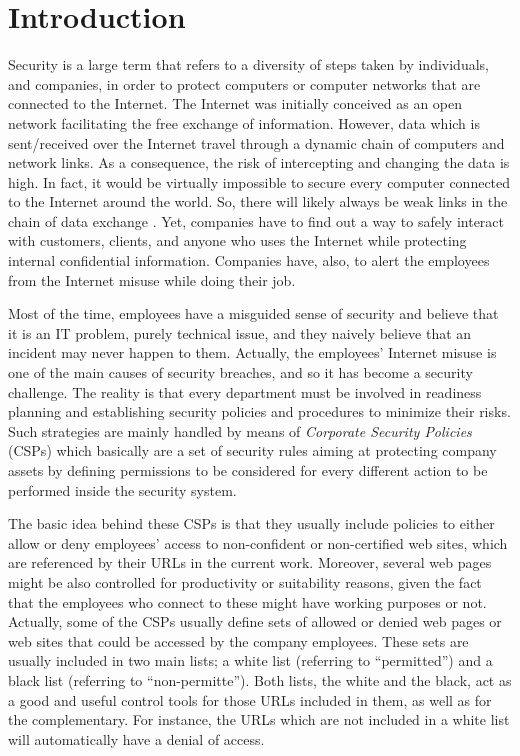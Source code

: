 \documentclass{llncs}
\begin{document}

%
%
\section{Introduction}
\label{sec:introduction}

\noindent Security is a large term that refers to a diversity of steps taken by individuals, and companies, in order to protect computers or computer networks that are connected to the Internet. The Internet was initially conceived as an open network facilitating the free exchange of information. However, data which is sent/received over the Internet travel through a dynamic chain of computers and network links. As a consequence, the risk of intercepting and changing the data is high. In fact, it would be virtually impossible to secure every computer connected to the Internet around the world. So, there will likely always be weak links in the chain of data exchange \cite{cheswick2003firewalls}. Yet, companies have to find out a way to safely interact with customers, clients, and anyone who uses the Internet while protecting internal confidential information. Companies have, also, to alert the employees from the Internet misuse while doing their job.
 
Most of the time, employees have a misguided sense of security and believe that it is an IT problem, purely technical issue, and they naively believe that an incident may never happen to them. Actually, the employees' Internet misuse is one of the main causes of security breaches, and so it has become a security challenge. The reality is that every department must be involved in readiness planning and establishing security policies and procedures to minimize their risks. Such strategies are mainly handled by means of \textit{Corporate Security Policies} (CSPs) which basically are a set of security rules aiming at protecting company assets by defining permissions to be considered for every different action to be performed inside the security system.
 
The basic idea behind these CSPs is that they usually include policies to either allow or deny employees' access to non-confident or non-certified web sites, which are referenced by their URLs in the current work. Moreover, several web pages might be also controlled for productivity or suitability reasons, given the fact that the employees who connect to these might have working purposes or not. Actually, some of the CSPs usually define sets of allowed or denied web pages or web sites that could be accessed by the company employees. These sets are usually included in two main lists; a white list (referring to ``permitted'') and a black list (referring to ``non-permitte''). Both lists, the white and the black, act as a good and useful control tools for those URLs included in them, as well as for the complementary. For instance, the URLs which are not included in a white list will automatically have a denial of access.
\end{document}

